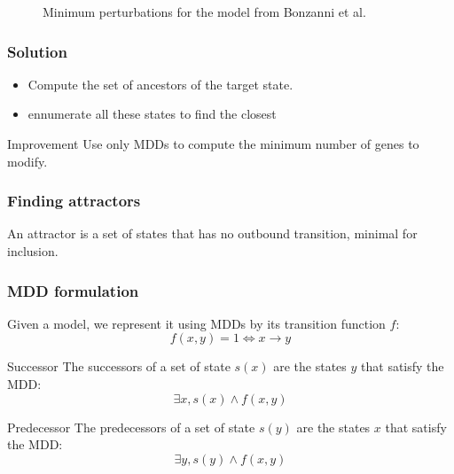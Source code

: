 \documentclass{beamer}
\begin{document}
\begin{frame}
  \begin{figure}
    \caption{Minimum perturbations for the model from Bonzanni et al.}
  \end{figure}
\end{frame}

\begin{frame}
  \frametitle{Solution}
  \begin{itemize}
  \item Compute the set of ancestors of the target state.
    \bigskip
    
  \item ennumerate all these states to find the closest
  \end{itemize}
  \bigskip
  
  \begin{block}{Improvement}
    Use only MDDs to compute the minimum number of genes to modify.
  \end{block}
\end{frame}


\begin{frame}
  \frametitle{Finding attractors}
  \begin{definition}
    An attractor is a set of states that has no outbound transition, minimal for inclusion.
  \end{definition}
\end{frame}

\begin{frame}
  \frametitle{MDD formulation}
  \begin{block}{}
    Given a model, we represent it using MDDs by its transition function $f$:
    $$ f(x,y) =1 \Leftrightarrow x \rightarrow y$$
  \end{block}
  
  \begin{block}{Successor}
    The successors of a set of state $s(x)$ are the states $y$ that satisfy the MDD:
    $$ \exists x, s(x) \wedge f(x,y)$$
  \end{block}
  
  \begin{block}{Predecessor}
    The predecessors of a set of state $s(y)$ are the states $x$ that satisfy the MDD:
    $$ \exists y, s(y) \wedge f(x,y)$$
  \end{block}
\end{frame}
\end{document}
